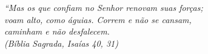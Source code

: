 \begin{epigrafe}
    \vspace*{\fill}
	\begin{flushright}
		

		\textit{``Mas os que confiam no Senhor renovam suas forças;\\ voam alto, como águias. Correm e não se cansam,\\ caminham e não desfalecem.\\
		(Bíblia Sagrada, Isaías 40, 31)}
	\end{flushright}
\end{epigrafe}
